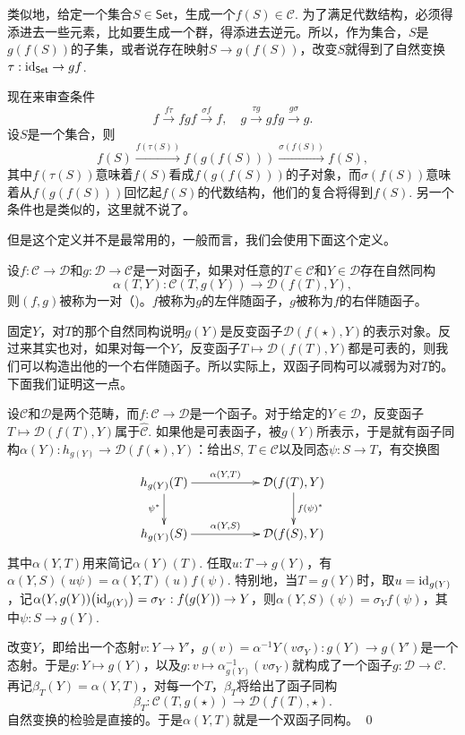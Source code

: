 类似地，给定一个集合$S\in \mathsf{Set}$，生成一个$f(S)\in \mathcal{C}$. 为了满足代数结构，必须得添进去一些元素，比如要生成一个群，得添进去逆元。所以，作为集合，$S$是$g(f(S))$的子集，或者说存在映射$S\to g(f(S))$，改变$S$就得到了自然变换$\tau:\operatorname{id}_{\mathsf{Set}}\to gf$.

现在来审查条件
\[
	f\xrightarrow{f\tau}fgf\xrightarrow{\sigma f}f,\quad g\xrightarrow{\tau g}gfg\xrightarrow{g\sigma}g.
\]
设$S$是一个集合，则
\[
	f(S)\xrightarrow{f(\tau(S))}f(g(f(S)))\xrightarrow{\sigma(f(S))}f(S),
\]
其中$f(\tau(S))$意味着$f(S)$看成$f(g(f(S)))$的子对象，而$\sigma(f(S))$意味着从$f(g(f(S)))$回忆起$f(S)$的代数结构，他们的复合将得到$f(S)$. 另一个条件也是类似的，这里就不说了。

但是这个定义并不是最常用的，一般而言，我们会使用下面这个定义。

\para 设$f:\mathcal{C}\to \mathcal{D}$和$g:\mathcal{D}\to \mathcal{C}$是一对函子，如果对任意的$T\in\mathcal{C}$和$Y\in\mathcal{D}$存在自然同构
\[
	\alpha(T,Y):\mathcal{C}(T,g(Y))\to \mathcal{D}(f(T),Y),
\]
则$(f,g)$被称为一对（)。$f$被称为$g$的左伴随函子，$g$被称为$f$的右伴随函子。

固定$Y$，对$T$的那个自然同构说明$g(Y)$是反变函子$\mathcal{D}(f(\star),Y)$的表示对象。反过来其实也对，如果对每一个$Y$，反变函子$T\mapsto {\mathcal{D}}(f(T),Y)$都是可表的，则我们可以构造出他的一个右伴随函子。所以实际上，双函子同构可以减弱为对$T$的。下面我们证明这一点。

\proof 
	设$\mathcal{C}$和$\mathcal{D}$是两个范畴，而$f:\mathcal{C}\to \mathcal{D}$是一个函子。对于给定的$Y\in\mathcal{D}$，反变函子$T\mapsto {\mathcal{D}}(f(T),Y)$属于$\hat{\mathcal{C}}$. 如果他是可表函子，被$g(Y)$所表示，于是就有函子同构$\alpha(Y):h_{g(Y)}\to {\mathcal{D}}(f(\star),Y)$：给出$S$, $T\in \mathcal{C}$以及同态$\psi:S\to T$，有交换图
	\[
	\begin{xy}
		\xymatrix{
			h_{g(Y)}(T)\ar[rr]^-{\alpha(Y,T)} \ar[d]_{\psi^*}&&{\mathcal{D}}(f(T),Y) \ar[d]^{f(\psi)^*}\\
			h_{g(Y)}(S)\ar[rr]^-{\alpha(Y,S)}&&{\mathcal{D}}(f(S),Y)
		}
	\end{xy}
	\]
	其中$\alpha(Y,T)$用来简记$\alpha(Y)(T)$. 任取$u:T\to {g(Y)}$，有$\alpha(Y,S)(u\psi)=\alpha(Y,T)(u)f(\psi)$. 特别地，当$T=g(Y)$时，取$u=\operatorname{id}_{g(Y)}$，记$\alpha(Y,g(Y))\bigl(\operatorname{id}_{g(Y)}\bigr)=\sigma_Y:f(g(Y))\to Y$，则$\alpha(Y,S)(\psi)=\sigma_Y f(\psi)$，其中$\psi:S\to g(Y)$.

	改变$Y$，即给出一个态射$v:Y\to Y'$，$g(v)=\alpha^{-1}{Y}\left(v\sigma_Y\right):g(Y)\to g(Y')$是一个态射。于是$g:Y\mapsto g(Y)$，以及$g:v\mapsto \alpha^{-1}_{g(Y)}\left(v\sigma_Y\right)$就构成了一个函子$g:\mathcal{D}\to \mathcal{C}$. 再记$\beta_T(Y)=\alpha(Y,T)$，对每一个$T$，$\beta_T$将给出了函子同构
	\[
		\beta_T:\mathcal{C}(T,g(\star))\to \mathcal{D}(f(T),\star).
	\]
	自然变换的检验是直接的。于是$\alpha(Y,T)$就是一个双函子同构。
\qed

